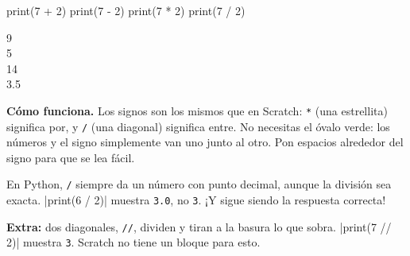 \begin{tcbraster}[raster columns=2, raster equal height=rows, raster column skip=12pt, raster valign=center, raster force size=false, raster odd column/.style={add to width=-1.2cm}, raster even column/.style={add to width=1.2cm}]
\begin{tcolorbox}[colback=white, colframe=white, boxrule=0pt, valign=center]
\begin{scratch}
\end{scratch}
\end{tcolorbox}
\begin{tcolorbox}[colback=white, colframe=white, boxrule=0pt, left=0pt, right=0pt, top=0pt, bottom=0pt, valign=center]
\begin{code}
print(7 + 2)
print(7 - 2)
print(7 * 2)
print(7 / 2)
\end{code}
\begin{outputbox}
9\\
5\\
14\\
3.5
\end{outputbox}
\end{tcolorbox}
\end{tcbraster}

\textbf{Cómo funciona.} Los signos son los mismos que en Scratch: \texttt{*} (una estrellita) significa por, y \texttt{/} (una diagonal) significa entre. No necesitas el óvalo verde: los números y el signo simplemente van uno junto al otro. Pon espacios alrededor del signo para que se lea fácil.

\begin{watchout}
En Python, \texttt{/} siempre da un número con punto decimal, aunque la división sea exacta. \py|print(6 / 2)| muestra \texttt{3.0}, no \texttt{3}. ¡Y sigue siendo la respuesta correcta!

\textbf{Extra:} dos diagonales, \texttt{//}, dividen y tiran a la basura lo que sobra. \py|print(7 // 2)| muestra \texttt{3}. Scratch no tiene un bloque para esto.
\end{watchout}

